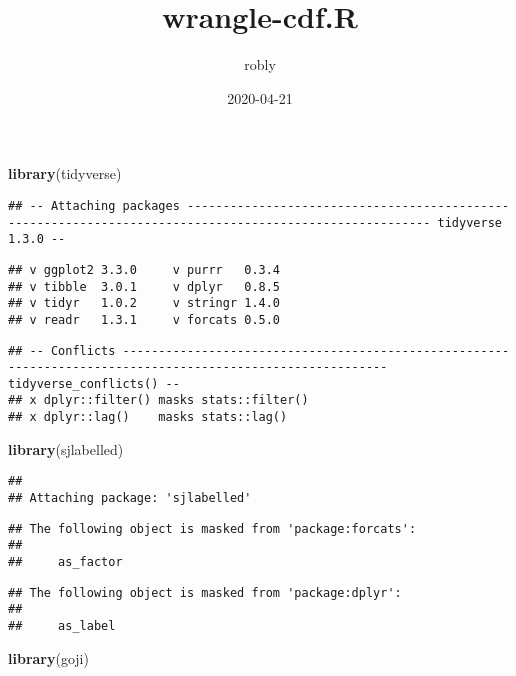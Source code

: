 \documentclass[
]{article}
\title{wrangle-cdf.R}
\author{robly}
\date{2020-04-21}
\newenvironment{Shaded}{\begin{snugshade}}{\end{snugshade}}
\newcommand{\KeywordTok}[1]{\textcolor[rgb]{0.13,0.29,0.53}{\textbf{#1}}}
\newcommand{\NormalTok}[1]{#1}
\begin{document}
\maketitle

\begin{Shaded}
\begin{Highlighting}[]
\KeywordTok{library}\NormalTok{(tidyverse)}
\end{Highlighting}
\end{Shaded}

\begin{verbatim}
## -- Attaching packages -------------------------------------------------------------------------------------------------------- tidyverse 1.3.0 --
\end{verbatim}

\begin{verbatim}
## v ggplot2 3.3.0     v purrr   0.3.4
## v tibble  3.0.1     v dplyr   0.8.5
## v tidyr   1.0.2     v stringr 1.4.0
## v readr   1.3.1     v forcats 0.5.0
\end{verbatim}

\begin{verbatim}
## -- Conflicts ----------------------------------------------------------------------------------------------------------- tidyverse_conflicts() --
## x dplyr::filter() masks stats::filter()
## x dplyr::lag()    masks stats::lag()
\end{verbatim}

\begin{Shaded}
\begin{Highlighting}[]
\KeywordTok{library}\NormalTok{(sjlabelled)}
\end{Highlighting}
\end{Shaded}

\begin{verbatim}
## 
## Attaching package: 'sjlabelled'
\end{verbatim}

\begin{verbatim}
## The following object is masked from 'package:forcats':
## 
##     as_factor
\end{verbatim}

\begin{verbatim}
## The following object is masked from 'package:dplyr':
## 
##     as_label
\end{verbatim}

\begin{Shaded}
\begin{Highlighting}[]
\KeywordTok{library}\NormalTok{(goji)}
\end{Highlighting}
\end{Shaded}
\end{document}
